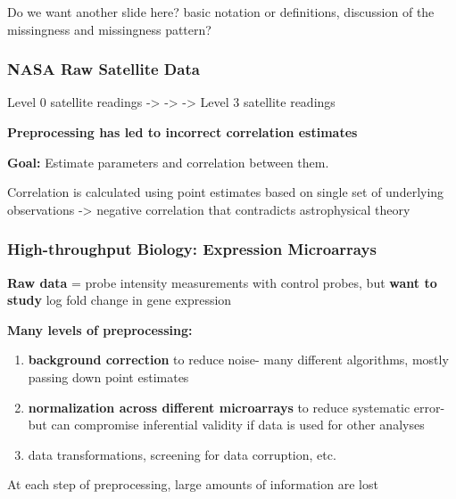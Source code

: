 \documentclass[10pt, compress]{beamer}
\begin{document}
\begin{frame}[fragile]
    Do we want another slide here? basic notation or definitions, discussion of the missingness and missingness pattern?

\end{frame}

\begin{frame}[fragile]
    \frametitle{NASA Raw Satellite Data}
    
    Level 0 satellite readings -> -> -> Level 3 satellite readings
    
    \vspace*{8mm}

    \textbf{Preprocessing has led to incorrect correlation estimates}
    
    \vspace*{2mm}

    \textbf{Goal:} Estimate parameters and correlation between them.
    
    Correlation is calculated using point estimates based on single set of underlying observations -> negative correlation that contradicts astrophysical theory

\end{frame}

\begin{frame}[fragile]
    \frametitle{High-throughput Biology: Expression Microarrays}
    
    \textbf{Raw data} = probe intensity measurements with control probes, but \textbf{want to study} log fold change in gene expression
    
    \textbf{Many levels of preprocessing:} 

    \begin{enumerate} [<+->]
    \item \textbf{background correction} to reduce noise- many different algorithms, mostly passing down point estimates
    \vspace*{5mm}
    \item \textbf{normalization across different microarrays} to reduce systematic error- but can compromise inferential validity if data is used for other analyses
    \vspace*{5mm}
    \item data transformations, screening for data corruption, etc.
    \end{enumerate}
    
    At each step of preprocessing, large amounts of information are lost

\end{frame}
\end{document}
